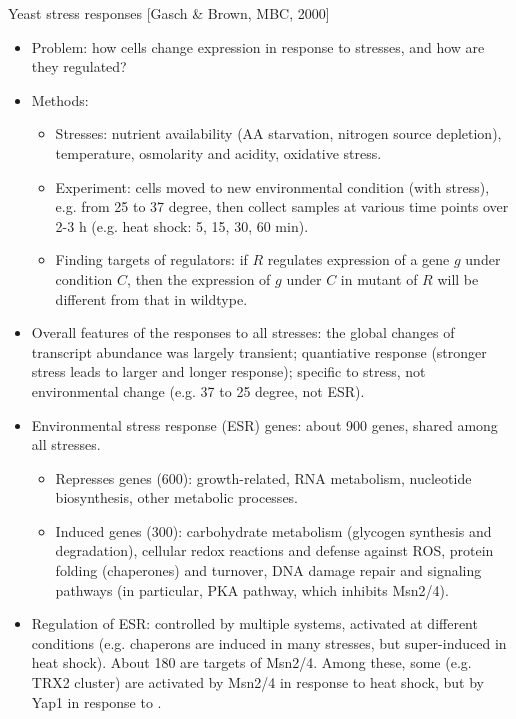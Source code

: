 \documentclass{report}
\begin{document}
Yeast stress responses [Gasch \& Brown, MBC, 2000]
\begin{itemize}
	\item Problem: how cells change expression in response to stresses, and how are they regulated?
	
	\item Methods: 
	\begin{itemize}
		\item Stresses: nutrient availability (AA starvation, nitrogen source depletion), temperature, osmolarity and acidity, oxidative stress. 
		\item Experiment: cells moved to new environmental condition (with stress), e.g. from 25 to 37 degree, then collect samples at various time points over 2-3 h (e.g. heat shock: 5, 15, 30, 60 min). 
		\item Finding targets of regulators: if $R$ regulates expression of a gene $g$ under condition $C$, then the expression of $g$ under $C$ in mutant of $R$ will be different from that in wildtype. 
	\end{itemize}
	
	\item Overall features of the responses to all stresses: the global changes of transcript abundance was largely transient; quantiative response (stronger stress leads to larger and longer response); specific to stress, not environmental change (e.g. 37 to 25 degree, not ESR). 
	\item Environmental stress response (ESR) genes: about 900 genes, shared among all stresses. 
	\begin{itemize}
		\item Represses genes (600): growth-related, RNA metabolism, nucleotide biosynthesis, other metabolic processes. 
		\item Induced genes (300): carbohydrate metabolism (glycogen synthesis and degradation), cellular redox reactions and defense against ROS, protein folding (chaperones) and turnover, DNA damage repair and signaling pathways (in particular, PKA pathway, which inhibits Msn2/4). 
	\end{itemize}
	\item Regulation of ESR: controlled by multiple systems, activated at different conditions (e.g. chaperons are induced in many stresses, but super-induced in heat shock). About 180 are targets of Msn2/4. Among these, some (e.g. TRX2 cluster) are activated by Msn2/4 in response to heat shock, but by Yap1 in response to . 
	

\end{itemize}
\end{document}
